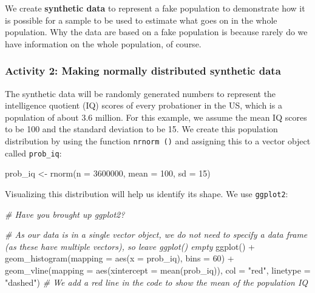 \documentclass[
]{book}
\newenvironment{Shaded}{\begin{snugshade}}{\end{snugshade}}
\newcommand{\AttributeTok}[1]{\textcolor[rgb]{0.77,0.63,0.00}{#1}}
\newcommand{\CommentTok}[1]{\textcolor[rgb]{0.56,0.35,0.01}{\textit{#1}}}
\newcommand{\DecValTok}[1]{\textcolor[rgb]{0.00,0.00,0.81}{#1}}
\newcommand{\FunctionTok}[1]{\textcolor[rgb]{0.00,0.00,0.00}{#1}}
\newcommand{\NormalTok}[1]{#1}
\newcommand{\OtherTok}[1]{\textcolor[rgb]{0.56,0.35,0.01}{#1}}
\newcommand{\SpecialCharTok}[1]{\textcolor[rgb]{0.00,0.00,0.00}{#1}}
\newcommand{\StringTok}[1]{\textcolor[rgb]{0.31,0.60,0.02}{#1}}
\begin{document}
We create \textbf{synthetic data} to represent a fake population to demonstrate how it is possible for a sample to be used to estimate what goes on in the whole population. Why the data are based on a fake population is because rarely do we have information on the whole population, of course.

\hypertarget{activity-2-making-normally-distributed-synthetic-data}{%
\subsubsection{Activity 2: Making normally distributed synthetic data}\label{activity-2-making-normally-distributed-synthetic-data}}

The synthetic data will be randomly generated numbers to represent the intelligence quotient (IQ) scores of every probationer in the US, which is a population of about 3.6 million. For this example, we assume the mean IQ scores to be 100 and the standard deviation to be 15. We create this population distribution by using the function \texttt{nrnorm\ ()} and assigning this to a vector object called \texttt{prob\_iq}:

\begin{Shaded}
\begin{Highlighting}[]
\NormalTok{prob\_iq }\OtherTok{\textless{}{-}} \FunctionTok{rnorm}\NormalTok{(}\AttributeTok{n =} \DecValTok{3600000}\NormalTok{, }\AttributeTok{mean =} \DecValTok{100}\NormalTok{, }\AttributeTok{sd =} \DecValTok{15}\NormalTok{)}
\end{Highlighting}
\end{Shaded}

Visualizing this distribution will help us identify its shape. We use \texttt{ggplot2}:

\begin{Shaded}
\begin{Highlighting}[]
\CommentTok{\# Have you brought up \textquotesingle{}ggplot2\textquotesingle{}?}

\CommentTok{\# As our data is in a single vector object, we do not need to specify a data frame (as these have multiple vectors), so leave ggplot() empty}
\FunctionTok{ggplot}\NormalTok{() }\SpecialCharTok{+} 
  \FunctionTok{geom\_histogram}\NormalTok{(}\AttributeTok{mapping =} \FunctionTok{aes}\NormalTok{(}\AttributeTok{x =}\NormalTok{ prob\_iq), }\AttributeTok{bins =} \DecValTok{60}\NormalTok{) }\SpecialCharTok{+} 
  \FunctionTok{geom\_vline}\NormalTok{(}\AttributeTok{mapping =} \FunctionTok{aes}\NormalTok{(}\AttributeTok{xintercept =} \FunctionTok{mean}\NormalTok{(prob\_iq)), }\AttributeTok{col =} \StringTok{"red"}\NormalTok{, }\AttributeTok{linetype =} \StringTok{"dashed"}\NormalTok{) }\CommentTok{\# We add a red line in the code to show the mean of the population IQ}
\end{Highlighting}
\end{Shaded}
\end{document}
